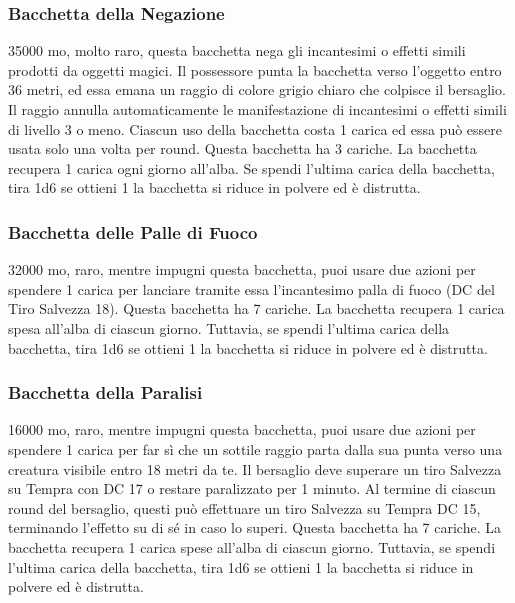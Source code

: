 \begin{multicols}{2}

	\subsubsection*{Bacchetta della Negazione}
	35000 mo, molto raro, questa bacchetta nega gli incantesimi o effetti simili prodotti da oggetti magici. Il possessore punta la bacchetta verso l'oggetto entro 36 metri, ed essa emana un raggio di colore grigio chiaro che colpisce il bersaglio. Il raggio annulla automaticamente le manifestazione di incantesimi o effetti simili di livello 3 o meno. Ciascun uso della bacchetta costa 1 carica ed essa può essere usata solo una volta per round. Questa bacchetta ha 3 cariche. La bacchetta recupera 1 carica ogni giorno all'alba. Se spendi l'ultima carica della bacchetta, tira 1d6 se ottieni 1 la bacchetta si riduce in polvere ed è distrutta.

	\subsubsection*{Bacchetta delle Palle di Fuoco}
	32000 mo, raro, mentre impugni questa bacchetta, puoi usare due azioni per spendere 1 carica per lanciare tramite essa l'incantesimo palla di fuoco (DC del Tiro Salvezza 18). Questa bacchetta ha 7 cariche. La bacchetta recupera 1 carica spesa all'alba di ciascun giorno. Tuttavia, se spendi l'ultima carica della bacchetta, tira 1d6 se ottieni 1 la bacchetta si riduce in polvere ed è distrutta.

	\subsubsection*{Bacchetta della Paralisi}
	16000 mo, raro, mentre impugni questa bacchetta, puoi usare due azioni per spendere 1 carica per far sì che un sottile raggio parta dalla sua punta verso una creatura visibile entro 18 metri da te. Il bersaglio deve superare un tiro Salvezza su Tempra con DC 17 o restare paralizzato per 1 minuto. Al termine di ciascun round del bersaglio, questi può effettuare un tiro Salvezza su Tempra DC 15, terminando l'effetto su di sé in caso lo superi. Questa bacchetta ha 7 cariche. La bacchetta recupera 1 carica spese all'alba di ciascun giorno. Tuttavia, se spendi l'ultima carica della bacchetta, tira 1d6 se ottieni 1 la bacchetta si riduce in polvere ed è distrutta.


\end{multicols}
